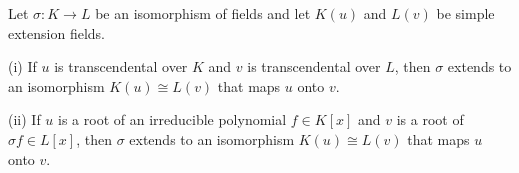 Let $\sigma : K \to L$ be an isomorphism of fields and let $K(u)$ and $L(v)$ be simple extension fields.

(i) If $u$ is transcendental over $K$ and $v$ is transcendental over $L$, then $\sigma$ extends to an isomorphism $K(u) \cong L(v)$ that maps $u$ onto $v$.

(ii) If $u$ is a root of an irreducible polynomial $f \in K[x]$ and $v$ is a root of $\sigma f \in L[x]$, then $\sigma$ extends to an isomorphism $K(u) \cong L(v)$ that maps $u$ onto $v$.
